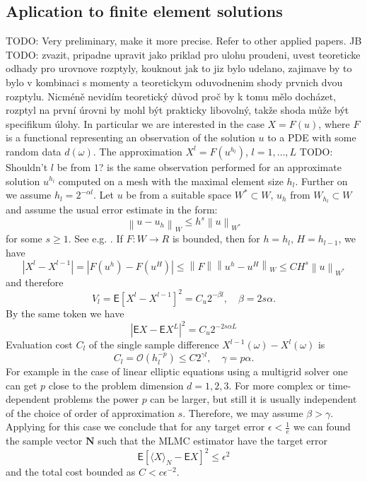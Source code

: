 \documentclass{article}
\def\vc#1{\mathbf{\boldsymbol{#1}}}     %
\def \E{{\mathsf E}}
\newcommand{\norm}[1]{\left\lVert#1\right\rVert}
\def\todo#1{{\color{red}TODO: #1}}
\def\avg#1{\langle#1\rangle}
\def\abs#1{|#1|}
\newcommand{\jb}[1]{{\color{violet}#1}}  %
\begin{document}
\subsection{Aplication to finite element solutions}
\todo{Very preliminary, make it more precise. Refer to other applied papers.}
\jb{JB TODO: zvazit, pripadne upravit jako priklad pro ulohu proudeni, uvest teoreticke odhady pro urovnove rozptyly, kouknout jak to jiz bylo udelano, zajimave by to bylo v kombinaci s momenty a teoretickym oduvodnenim shody prvnich dvou rozptylu. 
Nicméně nevidím teoretický důvod proč by k tomu mělo docházet, rozptyl na první úrovni by mohl být prakticky libovolný, takže shoda může být specifikum úlohy.}
In particular we are interested in the case $X=F(u)$, where $F$ is a functional representing an observation of
the solution $u$ to a PDE with some random data $d(\omega)$. The approximation $X^l = F(u^{h_l})$, $l=1,\dots,L$ \todo{Shouldn't $l$ be from $1$? } is the same observation performed for an approximate solution $u^{h_l}$ computed on a mesh with the maximal element size $h_l$. Further on we assume $h_l = 2^{-\alpha l}$. Let $u$ be from a suitable space 
$W^* \subset W$, $u_h$ from $W_{h_l} \subset W$ and assume the usual error estimate in the form:
\[
	\norm{u - u_h}_{W} \le h^s \norm{u}_{W^*}
\] 
for some $s\ge 1$. See e.g. \cite{Evans1998}.
If $F:W \to R$ is bounded, then for $h=h_l$, $H=h_{l-1}$, we have
\[
	\abs{X^l - X^{l-1}} = \abs{F(u^h) - F(u^H)} \le \norm{F}\norm{u^h - u^H}_W \le C H^s\norm{u}_{W^*}
\]
and therefore 
\begin{equation}
    \label{eq:level_var_pde_est}
    V_l =  \E[X^l - X^{l-1}]^2 = C_u 2^{-\beta l},\quad \beta = 2s\alpha.
\end{equation}
By the same token we have 
\begin{equation}
    \label{eq:aprox_pde_est}
    \abs{\E X - \E X^L}^2 = C_u 2^{-2s\alpha L}
\end{equation}
Evaluation cost $C_l$ of the single sample difference $X^{l-1}(\omega) - X^l(\omega)$ is
\[
  C_l = \mathcal O( h_l^{-p}) \le C 2^{\gamma l}, \quad \gamma = p\alpha.
\]
For example in the case of linear elliptic equations using a multigrid solver one can get $p$ close to the problem dimension $d=1,2,3$. For more complex or time-dependent problems the power $p$ can be larger, but 
still it is usually independent of the choice of order of approximation $s$. Therefore, we may assume
$\beta > \gamma$. Applying \cite[Theorem 1]{Giles2015} for this case we conclude that for any target error 
$\epsilon< \frac{1}{e}$ we can found the sample vector $\vc N$ such that the MLMC estimator have the target error
\[
  \E[\avg{X}_N - \E X]^2 \le \epsilon^2
\]
and the total cost bounded as $C < c \epsilon^{-2}$.
\end{document}
